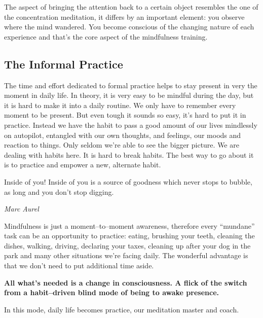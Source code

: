 \documentclass[../Book.Stress_regulation.tex]{subfiles}
\begin{document}
The aspect of bringing the attention back to a certain object resembles the one of the concentration meditation, it differs by an important element: you observe where the mind wandered. You become conscious of the changing nature of each experience and that's the core aspect of the mindfulness training.

\subsection{The Informal Practice}

The time and effort dedicated to formal practice helps to {stay present} in very the moment in daily life. 
In theory, it is very easy to be mindful during the day, but it is hard to make it into a {daily routine}. We only have to remember every moment to be present. But even tough it sounds so easy, it's hard to put it in practice.
Instead we have the habit to pass a good amount of our lives mindlessly on {autopilot}, entangled with our own thoughts, and feelings, our moods and reaction to things. Only seldom we're able to see the bigger picture.
 We are dealing with {habits} here. It is hard to break habits. The best way to go about it is to practice and {empower a new, alternate habit}.

 \epigraph{Inside of you! Inside of you is a source of goodness which never stops to bubble, as long and you don't stop digging.}{\textit{Marc Aurel}}


Mindfulness is just a {moment--to--moment awareness}, therefore every ``mundane'' task can be an opportunity to practice: eating, brushing your teeth, cleaning the dishes, walking, driving, declaring your taxes, cleaning up after your dog in the park and many other situations we're facing daily.
The wonderful advantage is that we don't need to put additional time aside.


\textbf{All what's needed is a change in consciousness. A flick of the switch from a habit--driven blind  mode of being to {awake presence}.}

In this mode, daily {life becomes practice, our meditation master and coach}.





\end{document}
